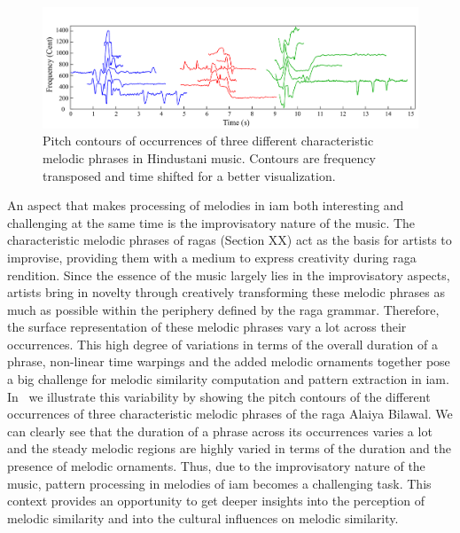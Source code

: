 \begin{figure}
	\begin{center}
		\includegraphics[width=\figSizeHundred]{ch01_introduction/figures/phraseClassesExample.pdf}
	\end{center}
	\caption{Pitch contours of occurrences of three different characteristic melodic phrases in Hindustani music. Contours are frequency transposed and time shifted for a better visualization.}
	\label{fig:phraseComplexityExample_intro}
\end{figure}

An aspect that makes processing of melodies in \gls{iam} both interesting and challenging at the same time is the improvisatory nature of the music. The characteristic melodic phrases of \glspl{raga} (Section XX) act as the basis for artists to improvise, providing them with a medium to express creativity during \gls{raga} rendition. Since the essence of the music largely lies in the improvisatory aspects, artists bring in novelty through creatively transforming these melodic phrases as much as possible within the periphery defined by the \gls{raga} grammar. Therefore, the surface representation of these melodic phrases vary a lot across their occurrences. This high degree of variations in terms of the overall duration of a phrase, non-linear time warpings and the added melodic ornaments together pose a big challenge for melodic similarity computation and pattern extraction in \gls{iam}. In~ we illustrate this variability by showing the pitch contours of the different occurrences of three characteristic melodic phrases of the \gls{raga} Alaiya Bilawal. We can clearly see that the duration of a phrase across its occurrences varies a lot and the steady melodic regions are highly varied in terms of the duration and the presence of melodic ornaments. Thus, due to the improvisatory nature of the music, pattern processing in melodies of \gls{iam} becomes a challenging task. This context provides an opportunity to get deeper insights into the perception of melodic similarity and into the cultural influences on melodic similarity. 

